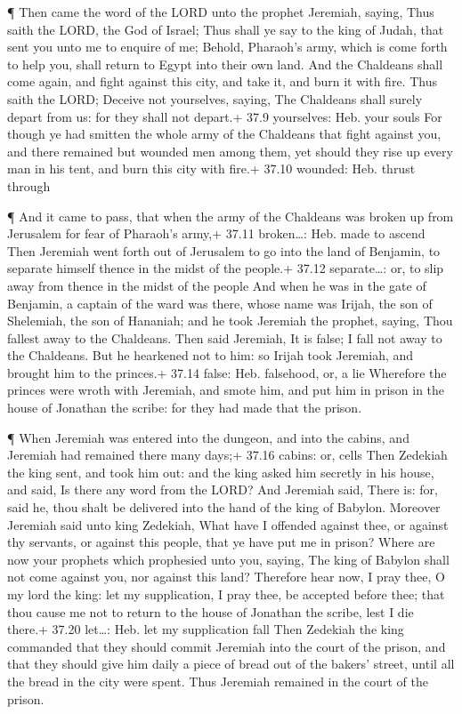  ¶ Then came the word of the LORD unto the prophet Jeremiah,
saying,  Thus saith the LORD, the God of Israel; Thus shall
ye say to the king of Judah, that sent you unto me to enquire of me;
Behold, Pharaoh's army, which is come forth to help you, shall return to
Egypt into their own land.  And the Chaldeans shall come
again, and fight against this city, and take it, and burn it with fire.
 Thus saith the LORD; Deceive not yourselves, saying, The
Chaldeans shall surely depart from us: for they shall not depart.+ 37.9
yourselves: Heb. your souls  For though ye had smitten the
whole army of the Chaldeans that fight against you, and there remained
but wounded men among them, yet should they rise up every man in his
tent, and burn this city with fire.+ 37.10 wounded: Heb. thrust through

 ¶ And it came to pass, that when the army of the Chaldeans
was broken up from Jerusalem for fear of Pharaoh's army,+ 37.11
broken\ldots: Heb. made to ascend  Then Jeremiah went forth
out of Jerusalem to go into the land of Benjamin, to separate himself
thence in the midst of the people.+ 37.12 separate\ldots: or, to slip
away from thence in the midst of the people  And when he
was in the gate of Benjamin, a captain of the ward was there, whose name
was Irijah, the son of Shelemiah, the son of Hananiah; and he took
Jeremiah the prophet, saying, Thou fallest away to the Chaldeans.
 Then said Jeremiah, It is false; I fall not away to the
Chaldeans. But he hearkened not to him: so Irijah took Jeremiah, and
brought him to the princes.+ 37.14 false: Heb. falsehood, or, a lie
 Wherefore the princes were wroth with Jeremiah, and smote
him, and put him in prison in the house of Jonathan the scribe: for they
had made that the prison.

 ¶ When Jeremiah was entered into the dungeon, and into the
cabins, and Jeremiah had remained there many days;+ 37.16 cabins: or,
cells  Then Zedekiah the king sent, and took him out: and
the king asked him secretly in his house, and said, Is there any word
from the LORD? And Jeremiah said, There is: for, said he, thou shalt be
delivered into the hand of the king of Babylon.  Moreover
Jeremiah said unto king Zedekiah, What have I offended against thee, or
against thy servants, or against this people, that ye have put me in
prison?  Where are now your prophets which prophesied unto
you, saying, The king of Babylon shall not come against you, nor against
this land?  Therefore hear now, I pray thee, O my lord the
king: let my supplication, I pray thee, be accepted before thee; that
thou cause me not to return to the house of Jonathan the scribe, lest I
die there.+ 37.20 let\ldots: Heb. let my supplication fall 
Then Zedekiah the king commanded that they should commit Jeremiah into
the court of the prison, and that they should give him daily a piece of
bread out of the bakers' street, until all the bread in the city were
spent. Thus Jeremiah remained in the court of the prison.

